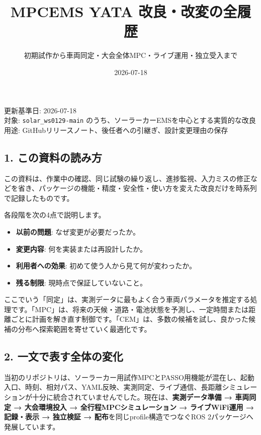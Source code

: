 \documentclass[
  japanese,
  a4paper,
  11pt]{article}
\title{MPCEMS YATA 改良・改変の全履歴}
\subtitle{初期試作から車両同定・大会全体MPC・ライブ運用・独立受入まで}
\author{}
\date{2026-07-18}
\providecommand{\tightlist}{%
  \setlength{\itemsep}{0pt}\setlength{\parskip}{0pt}}
\begin{document}
\maketitle

{
\setcounter{tocdepth}{3}
\tableofcontents
}
更新基準日: 2026-07-18\\
対象: \texttt{solar\_ws0129-main}
のうち、ソーラーカーEMSを中心とする実質的な改良\\
用途: GitHubリリースノート、後任者への引継ぎ、設計変更理由の保存

\subsection{1.
この資料の読み方}\label{1-ux3053ux306eux8cc7ux6599ux306eux8aadux307fux65b9}

この資料は、作業中の確認、同じ試験の繰り返し、進捗監視、入力ミスの修正などを省き、パッケージの機能・精度・安全性・使い方を変えた改良だけを時系列で記録したものです。

各段階を次の4点で説明します。

\begin{itemize}
\tightlist
\item
  \textbf{以前の問題}: なぜ変更が必要だったか。
\item
  \textbf{変更内容}: 何を実装または再設計したか。
\item
  \textbf{利用者への効果}: 初めて使う人から見て何が変わったか。
\item
  \textbf{残る制限}: 現時点で保証していないこと。
\end{itemize}

ここでいう「同定」は、実測データに最もよく合う車両パラメータを推定する処理です。「MPC」は、将来の天候・道路・電池状態を予測し、一定時間または距離ごとに計画を解き直す制御です。「CEM」は、多数の候補を試し、良かった候補の分布へ探索範囲を寄せていく最適化です。

\subsection{2.
一文で表す全体の変化}\label{2-ux4e00ux6587ux3067ux8868ux3059ux5168ux4f53ux306eux5909ux5316}

当初のリポジトリは、ソーラーカー用試作MPCとPASSO用機能が混在し、起動入口、時刻、相対パス、YAML反映、実測同定、ライブ通信、長距離シミュレーションが十分に統合されていませんでした。現在は、\textbf{実測データ準備
→ 車両同定 → 大会環境投入 → 全行程MPCシミュレーション → ライブWiFi運用 →
記録・表示 → 独立検証 → 配布}を同じprofile構造でつなぐROS
2パッケージへ発展しています。
\end{document}
